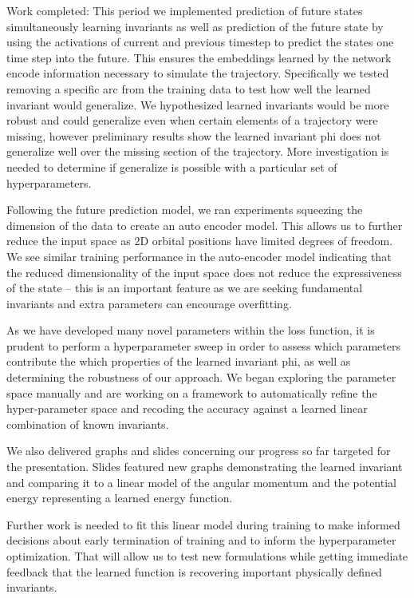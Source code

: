 \documentclass[10pt,letterpaper]{report}
\author{Brandon Houghton}
\begin{document}
	
	Work completed:
	This period we implemented prediction of future states simultaneously learning invariants as well as prediction of the future state by using the activations of current and previous timestep to predict the states one time step into the future. This ensures the embeddings learned by the network encode information necessary to simulate the trajectory. Specifically we tested removing a specific arc from the training data to test how well the learned invariant would generalize. We hypothesized learned invariants would be more robust and could generalize even when certain elements of a trajectory were missing, however preliminary results show the learned invariant phi does not generalize well over the missing section of the trajectory. More investigation is needed to determine if generalize is possible with a particular set of hyperparameters.
	
	Following the future prediction model, we ran experiments squeezing the dimension of the data to create an auto encoder model. This allows us to further reduce the input space as 2D orbital positions have limited degrees of freedom. We see similar training performance in the auto-encoder model indicating that the reduced dimensionality of the input space does not reduce the expressiveness of the state – this is an important feature as we are seeking fundamental invariants and extra parameters can encourage overfitting.
	
	As we have developed many novel parameters within the loss function, it is prudent to perform a hyperparameter sweep in order to assess which parameters contribute the which properties of the learned invariant phi, as well as determining the robustness of our approach. We began exploring the parameter space manually and are working on a framework to automatically refine the hyper-parameter space and recoding the accuracy against a learned linear combination of known invariants. 
	
	We also delivered graphs and slides concerning our progress so far targeted for the presentation. Slides featured new graphs demonstrating the learned invariant and comparing it to a linear model of the angular momentum and the potential energy representing a learned energy function. 
	
	Further work is needed to fit this linear model during training to make informed decisions about early termination of training and to inform the hyperparameter optimization. That will allow us to test new formulations while getting immediate feedback that the learned function is recovering important physically defined invariants.
	
\end{document}
